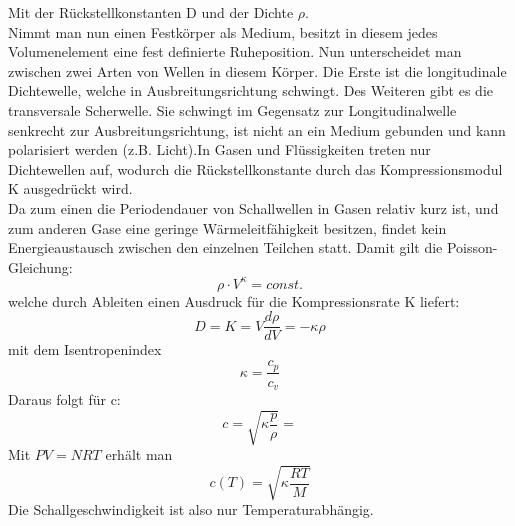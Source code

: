 \documentclass{article}
\begin{document}
{Mit der Rückstellkonstanten D und der Dichte \(\rho\).\\
Nimmt man nun einen Festkörper als Medium, besitzt in diesem jedes Volumenelement eine fest definierte Ruheposition. Nun unterscheidet man zwischen zwei Arten von Wellen in diesem Körper. Die Erste ist die longitudinale Dichtewelle, welche in Ausbreitungsrichtung schwingt. Des Weiteren gibt es die transversale Scherwelle. Sie schwingt im Gegensatz zur Longitudinalwelle senkrecht zur Ausbreitungsrichtung, ist nicht an ein Medium gebunden und kann polarisiert werden (z.B. Licht).In Gasen und Flüssigkeiten treten nur Dichtewellen auf, wodurch die Rückstellkonstante durch das Kompressionsmodul K ausgedrückt wird.\\
Da zum einen die Periodendauer von Schallwellen in Gasen relativ kurz ist, und zum anderen Gase eine geringe Wärmeleitfähigkeit besitzen, findet kein Energieaustausch zwischen den einzelnen Teilchen statt. Damit gilt die Poisson-Gleichung:
\begin{equation}
\label{rho}
\rho \cdot V^{\kappa} = const.
\end{equation}
welche durch Ableiten einen Ausdruck für die Kompressionsrate K liefert:
\begin{equation}
\label{K}
D = K = V \frac{d\rho}{dV}=-\kappa \rho
\end{equation}
mit dem Isentropenindex 
\begin{equation}
\label{kappa}
\kappa = \frac{c_{p}}{c_{v}}
\end{equation}
Daraus folgt für c:
\begin{equation}
c=\sqrt{\kappa\frac{p}{\rho}}=
\end{equation}
Mit \(PV = NRT\) erhält man
\begin{equation}
c(T) = \sqrt{\kappa\frac{RT}{M}} \label{c(T)}
\end{equation}
Die Schallgeschwindigkeit ist also nur Temperaturabhängig.

\newpage
}
\end{document}
